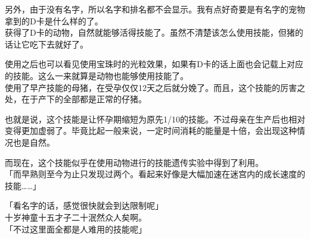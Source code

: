 另外，由于没有名字，所以名字和排名都不会显示。我有点好奇要是有名字的宠物拿到的D卡是什么样的了。\\

获得了D卡的动物，自然就能够活得技能了。虽然不清楚该怎么使用技能，但猪的话让它吃下去就好了。

使用之后也可以看见使用宝珠时的光粒效果，如果有D卡的话上面也会记载上对应的技能。这么一来就算是动物也能够使用技能了。\\

使用了早产技能的母猪，在受孕仅仅12天之后就分娩了。而且，这个技能的厉害之处，在于产下的全部都是正常的仔猪。

也就是说，这个技能是让怀孕期缩短为原先1/10的技能。不过母亲在生产后也相对变得更加虚弱了。毕竟比起一般来说，一定时间消耗的能量是十倍，会出现这种情况也是自然。

而现在，这个技能似乎在使用动物进行的技能遗传实验中得到了利用。\\

「而早熟则至今为止只发现过两个。看起来好像是大幅加速在迷宫内的成长速度的技能……」

「看名字的话，感觉很快就会到达限制呢」\\

十岁神童十五才子二十泯然众人矣啊。\\

「不过这里面全都是人难用的技能呢」\\

